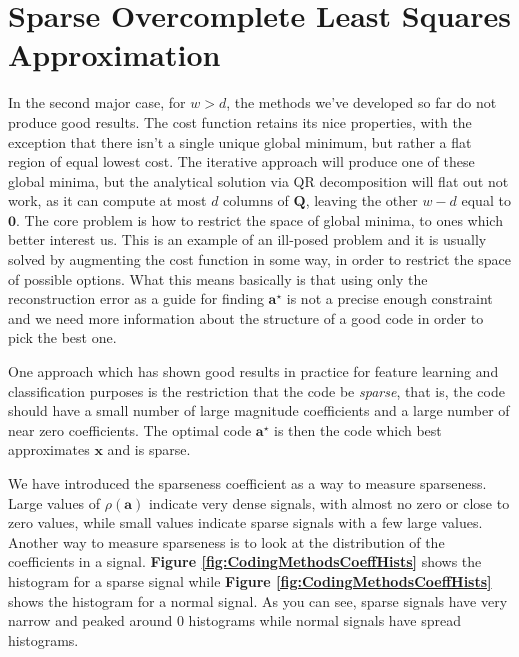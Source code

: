 \documentclass[12pt,a4paper,oneside,english]{UPBThesis}
\begin{document}
\section{Sparse Overcomplete Least Squares Approximation}
\label{sec:SparseOvercompleteLeastSquaresApproximation}

In the second major case, for $w > d$, the methods we've developed so far do not produce good results. The cost function retains its nice properties, with the exception that there isn't a single unique global minimum, but rather a flat region of equal lowest cost. The iterative approach will produce one of these global minima, but the analytical solution via QR decomposition will flat out not work, as it can compute at most $d$ columns of $\textbf{Q}$, leaving the other $w - d$ equal to $\textbf{0}$. The core problem is how to restrict the space of global minima, to ones which better interest us. This is an example of an ill-posed problem and it is usually solved by augmenting the cost function in some way, in order to restrict the space of possible options. What this means basically is that using only the reconstruction error as a guide for finding $\textbf{a}^\star$ is not a precise enough constraint and we need more information about the structure of a good code in order to pick the best one.

One approach which has shown good results in practice for feature learning \cite{emergence-sparse-coding,sparse-coding-strategy-V1} and classification purposes \cite{sparse-features-audio-classification,importance-encoding-sparse-coding-vq,simple-method-sparse-coding} is the restriction that the code be \emph{sparse}, that is, the code should have a small number of large magnitude coefficients and a large number of near zero coefficients. The optimal code $\textbf{a}^\star$ is then the code which best approximates $\textbf{x}$ and is sparse.

We have introduced the sparseness coefficient as a way to measure sparseness. Large values of $\rho(\textbf{a})$ indicate very dense signals, with almost no zero or close to zero values, while small values indicate sparse signals with a few large values. Another way to measure sparseness is to look at the distribution of the coefficients in a signal. \textbf{Figure \ref{fig:CodingMethodsCoeffHists}} shows the histogram for a sparse signal while \textbf{Figure \ref{fig:CodingMethodsCoeffHists}} shows the histogram for a normal signal. As you can see, sparse signals have very narrow and peaked around $0$ histograms while normal signals have spread histograms.
\end{document}

